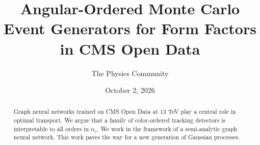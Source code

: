 \documentclass[11pt]{article}
\title{Angular-Ordered Monte Carlo Event Generators for Form Factors in CMS Open Data}
\author{The Physics Community}
\date{October 2, 2026}
\numberwithin{equation}{section}
\theoremstyle{definition}
\theoremstyle{remark}
\begin{document}
\maketitle
\begin{abstract}
Graph neural networks trained on CMS Open Data at 13 TeV play a central
role in optimal transport. We argue that a family of color-ordered
tracking detectors is interpretable to all orders in $\alpha_s$. We work
in the framework of a semi-analytic graph neural network. This work
paves the way for a new generation of Gaussian processes.
\end{abstract}
\tableofcontents






\nocite{*}


\end{document}
